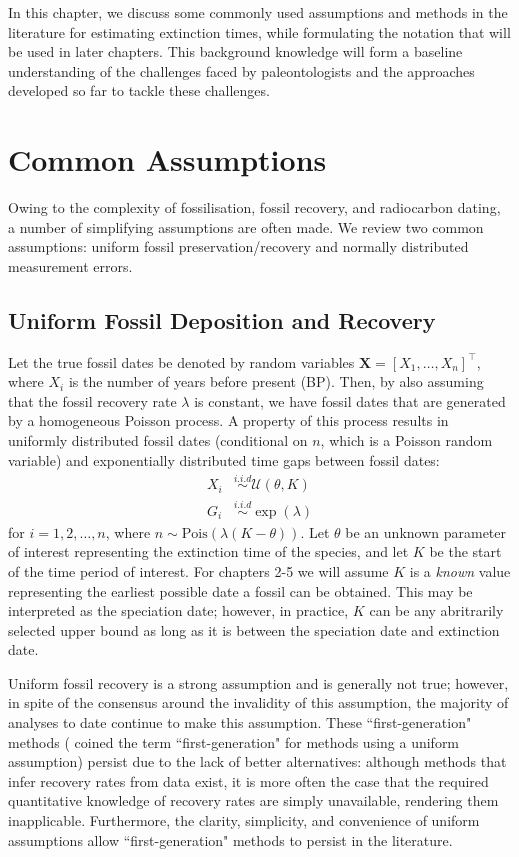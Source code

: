 
In this chapter, we discuss some commonly used assumptions and methods in the literature for estimating extinction times, while formulating the notation that will be used in later chapters. This background knowledge will form a baseline understanding of the challenges faced by paleontologists and the approaches developed so far to tackle these challenges.

\section{Common Assumptions}

Owing to the complexity of fossilisation, fossil recovery, and radiocarbon dating, a number of simplifying assumptions are often made. We review two common assumptions: uniform fossil preservation/recovery and normally distributed measurement errors.

\subsection{Uniform Fossil Deposition and Recovery}\label{ssec: ass_unif}

Let the true fossil dates be denoted by random variables $\bm{X} = [X_1, \dots, X_n]^\top$, where $X_i$ is the number of years before present (BP). Then, by also assuming that the fossil recovery rate $\lambda$ is constant, we have fossil dates that are generated by a homogeneous Poisson process. A property of this process results in uniformly distributed fossil dates (conditional on $n$, which is a Poisson random variable) and exponentially distributed time gaps between fossil dates:
\begin{align*}
    X_i  &\overset{i.i.d}{\sim} \mathcal{U}(\theta, K) \\
    G_i &\overset{i.i.d}{\sim} \exp{(\lambda)}
\end{align*}
for $i = 1, 2, \dots, n$, where  $n \sim \textrm{Pois}(\lambda(K-\theta))$. Let $\theta$ be an unknown parameter of interest representing the extinction time of the species, and let $K$ be the start of the time period of interest. For chapters 2-5 we will assume $K$ is a \textit{known} value representing the earliest possible date a fossil can be obtained. This may be interpreted as the speciation date; however, in practice, $K$ can be any abritrarily selected upper bound as long as it is between the speciation date and extinction date.

Uniform fossil recovery is a strong assumption and is generally not true; however, in spite of the consensus around the invalidity of this assumption, the majority of analyses to date continue to make this assumption. These ``first-generation" methods (\textcite{WangMarshall2016} coined the term ``first-generation" for methods using a uniform assumption) persist due to the lack of better alternatives: although methods that infer recovery rates from data exist, it is more often the case that the required quantitative knowledge of recovery rates are simply unavailable, rendering them inapplicable.  Furthermore, the clarity, simplicity, and convenience of uniform assumptions allow ``first-generation" methods to persist in the literature.

